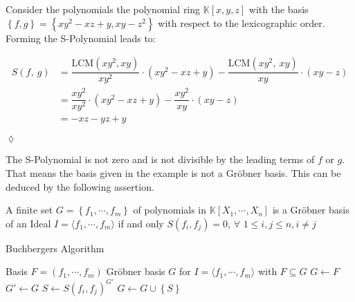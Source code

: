 \newpage

\begin{env_example}\normalfont
Consider the polynomials the polynomial ring $\mathbb{K}\left[ x,y,z\right] $ with
the basis $\left\lbrace f,g\right\rbrace = \left\lbrace xy^{2}-xz+y,xy-z^{2} \right\rbrace $ with respect to the lexicographic order.\\
Forming the S-Polynomial leads to:

\begin{align*}
 S \left(f,~g\right) &= \dfrac{\textrm{LCM}\left( xy^{2}, xy \right) } {xy^{2} } \cdot \left(  xy^{2}-xz+y\right) - \dfrac{\textrm{LCM}\left( xy^{2},~xy \right) } {xy } \cdot \left( xy-z \right) \\ 
 &= \dfrac{xy^{2}}{xy^{2}} \cdot \left( xy^{2}-xz+y\right) - \dfrac{xy^{2}}{xy} \cdot \left( xy-z\right) \\
 &= -xz-yz+y 
\end{align*}


\begin{flushright}
$\lozenge$
\end{flushright} 
\end{env_example}

The S-Polynomial is not zero and is not divisible by the leading terms of $f$ or $g$. That means the basis given in the example is not a Gröbner basis. This can be deduced by the following assertion.

\begin{env_definition}
\cite{KHZ} A finite set $G = \left\lbrace f_{1}, \cdots , f_{m} \right\rbrace$ of polynomials in $ \mathbb{K}\left[X_{1}, \cdots, X_{n}\right] $ is a Gröbner basis of an Ideal 
$I = \langle f_{1}, \cdots , f_{m} \rangle $ if and only $S\left( f_{i},f_{j}\right) = 0$, $ \forall$  $1 \leq i,j \leq n, i\neq j $

\end{env_definition}

\begin{algorithm}
\caption{Buchbergers Algorithm \cite{KHZ}}
\label{alg:buchberger}
\begin{algorithmic}[1]
\Require Basis $F = \left( f_{1}, \cdots, f_{m} \right)  $
\Ensure Gröbner basis $G$ for $I = \langle f_{1}, \cdots, f_{m} \rangle $ with $ F \subseteq G $
\State $G \gets F$
\Repeat
\State $G'\gets G $
\State $S \gets S\left( f_{i},f_{j} \right)^{G'}  $ 
\State $G \gets G \cup \left\lbrace S\right\rbrace $
\EndIf
\EndFor
{}

\end{algorithmic}
\end{algorithm}

